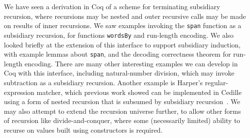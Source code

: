 \documentclass[a4paper,USenglish]{lipics-v2021}
\begin{document}
We have seen a derivation in Coq of a scheme for terminating
subsidiary recursion, where recursions may be nested and outer
recursive calls may be made on results of inner recursions.  We saw
examples invoking the \verb|span| function as a subsidiary recursion,
for functions \verb|wordsBy| and run-length encoding.  We also looked
briefly at the extension of this interface to support subsidiary
induction, with example lemmas about \verb|span|, and the decoding
correctness theorem for run-length encoding.  There are many other
interesting examples we can develop in Coq with this interface,
including natural-number division, which may invoke subtraction as a
subsidiary recursion.  Another example is Harper's regular-expression
matcher, which previous work showed can be implemented in Cedille
using a form of nested recursion that is subsumed by subsidiary
recursion~\cite{stump20}.  We may also attempt to extend the recursion
universe further, to allow other forms of recursion like
divide-and-conquer, where some (necessarily limited) ability to
recurse on values built using constructors is required.

\pagebreak

\end{document}
